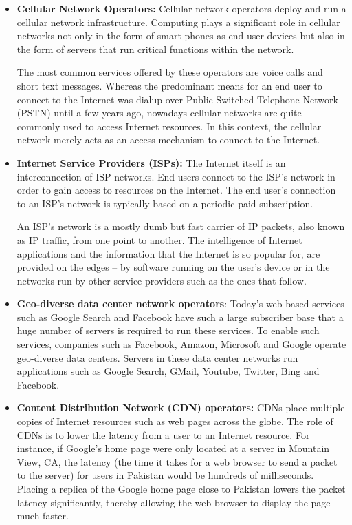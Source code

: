 \begin{itemize}
\item \textbf{Cellular Network Operators:} Cellular network operators deploy and run a cellular network infrastructure. Computing plays a significant role in cellular networks not only in the form of smart phones as end user devices but also in the form of servers that run critical functions within the network.  

The most common services offered by these operators are voice calls and short text messages. Whereas the predominant means for an end user to connect to the Internet was dialup over Public Switched Telephone Network (PSTN) until a few years ago, nowadays cellular networks are quite commonly used to access Internet resources. In this context, the cellular network merely acts as an access mechanism to connect to the Internet.


\item \textbf{Internet Service Providers (ISPs):} The Internet itself is an interconnection of ISP networks. End users connect to the ISP's network in order to gain access to resources on the Internet. The end user's connection to an ISP's network is typically based on a periodic paid subscription. 

An ISP's network is a mostly dumb but fast carrier of IP packets, also known as IP traffic, from one point to another. The intelligence of Internet applications and the information that the Internet is so popular for, are provided on the edges -- by software running on the user's device or in the networks run by other service providers such as the ones that follow.
\item \textbf{Geo-diverse data center network operators}: Today's web-based services such as Google Search and Facebook have such a large subscriber base that a huge number of servers is required to run these services. To enable such services, companies such as Facebook, Amazon, Microsoft and Google operate geo-diverse data centers. Servers in these data center networks run applications such as Google Search, GMail, Youtube, Twitter, Bing and Facebook.
\item \textbf{Content Distribution Network (CDN) operators:} CDNs place multiple copies of Internet resources such as web pages across the globe. The role of CDNs is to lower the latency from a user to an Internet resource. For instance, if Google's home page were only located at a server in Mountain View, CA, the latency (the time it takes for a web browser to send a packet to the server) for users in Pakistan would be hundreds of milliseconds. Placing a replica of the Google home page close to Pakistan lowers the packet latency significantly, thereby allowing the web browser to display the page much faster.
\end{itemize}


